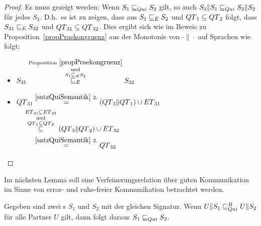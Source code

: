 \begin{proof}
  Es muss gezeigt werden: Wenn $S_1\sqsubseteq _{Qui} S_2$ gilt, so auch
  $S_3\|S_1\sqsubseteq _{Qui} S_3\|S_2$ für jedes $S_3$. D.h.\ es ist zu zeigen, dass aus
  $S_1\sqsubseteq _E S_2$ und $QT{}_1\subseteq QT{}_2$ folgt, dass $S_{31}\sqsubseteq _E
  S_{32}$ und $QT{}_{31}\subseteq QT{}_{32}$. Dies ergibt sich wie im Beweis
  zu Proposition~\ref{propPraekongruenz} aus der Monotonie von $\cdot\|\cdot$
  auf Sprachen wie folgt:
  \begin{itemize}
    \item $\begin{aligned}[t]
        S_{31} \overset{\mathrm{Proposition}~
        \ref{propPraekongruenz}}{\overset{\mathrm{und}}{\overset{S_1\sqsubseteq _E
    S_2}{\sqsubseteq _E}}} S_{32}
    \end{aligned}$
    \item $\begin{aligned}[t]
        \QT{}_{31} &\overset{\ref{satzQuiSemantik}~2.}{=}
        (\QT{}_3\|\QT{}_1)\cup \ET{}_{31}\\
        &\hspace{-0.5cm}\overset{\ET{}_{31}\subseteq
      \ET{}_{32}}{\overset{\mathrm{und}}{\overset{\QT{}_1\subseteq
      \QT{}_2}{\subseteq}}} (\QT{}_3\|\QT{}_2) \cup \ET{}_{32}\\
        &\overset{\ref{satzQuiSemantik}~2.}{=} \QT{}_{32}
    \end{aligned}$
  \end{itemize}
\end{proof}

Im nächsten Lemma soll eine Verfeinerungsrelation über guten Kommunikation im
Sinne von error- und ruhe-freier Kommunikation betrachtet werden.

\begin{lem}
  \label{lemQuiVerfeinerung}
  Gegeben sind zwei \EIO{}s $S_1$ und $S_2$ mit der gleichen Signatur. Wenn
  $U\|S_1\sqsubseteq _{Qui}^B U\|S_2$ für alle Partner $U$ gilt, dann folgt daraus $S_1\sqsubseteq _{Qui}
  S_2$.
\end{lem}

